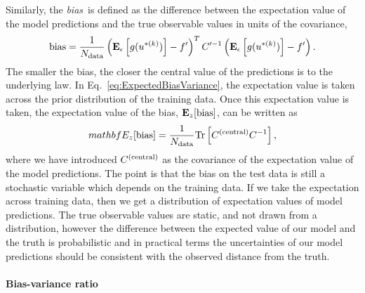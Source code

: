 Similarly, the {\em bias}\ is defined as the difference between the expectation
value of the model predictions and the true observable values in
units of the covariance, \ie 
\begin{equation}
    \label{eq:BiasDef}
    {\rm bias} = \frac{1}{N_{\rm data}}
    \left( \mathbf{E}_{\epsilon}\left[ g(u^{* (k)}) \right] - f^\prime \right)^T
        C^{\prime -1}
    \left( \mathbf{E}_{\epsilon}\left[ g(u^{* (k)}) \right] - f^\prime \right).
\end{equation}
The smaller the bias, the closer the central value of the predictions is to
the underlying law. In Eq.~\ref{eq:ExpectedBiasVariance}, the expectation
value is taken across the prior distribution of the training data. Once this
expectation value is taken, the expectation value of the bias, $\mathbf{E}_{z}[{\rm bias}]$,
can be written as
\begin{equation}
    mathbf{E}_{z}[{\rm bias}] = \frac{1}{N_{\rm data}}
    {\rm Tr} \left[ C^{(\rm central)} C^{-1}_{} \right],
\end{equation}
where we have introduced $C^{(\rm central)}$ as the covariance of the expectation value
of the model predictions. The point is that the bias on the test data is still
a stochastic variable which depends on the training data. If we take the
expectation across training data, then we get a distribution of expectation
values of model predictions. The true observable values are static, and not
drawn from a distribution, however the difference between the expected value of
our model and the truth is probabilistic and in practical terms the uncertainties
of our model predictions should be consistent with the observed distance
from the truth.

\paragraph{Bias-variance ratio}

